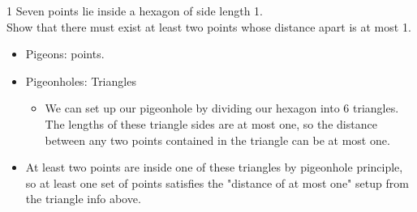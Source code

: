 \documentclass[12pt, letterpaper]{article}
\newcommand{\exheader}[1][ex]{{\tiny{#1}\normalsize}}
\begin{document}
\begin{minipage}[t]{0.75\linewidth}
\exheader[1] Seven points lie inside a hexagon of side length 1. \\ Show that there must exist at least two points whose distance apart is at most 1.
	\begin{itemize}[leftmargin=*, label={}]
		\item Pigeons: points.
		\item Pigeonholes: Triangles
		\begin{itemize}
			\item We can set up our pigeonhole by dividing our hexagon into 6 triangles. The lengths of these triangle sides are at most one, so the distance between any two points contained in the triangle can be at most one.
		\end{itemize} 
		\item At least two points are inside one of these triangles by pigeonhole principle, so at least one set of points satisfies the "distance of at most one" setup from the triangle info above.
	\end{itemize}
\end{minipage}
\end{document}
